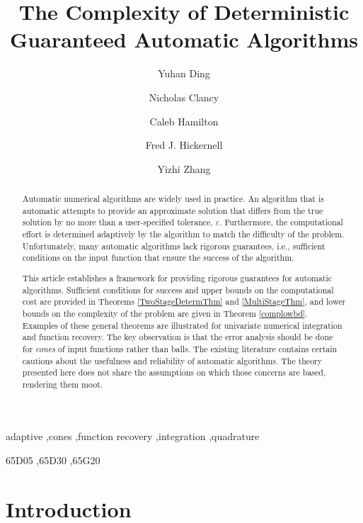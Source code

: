 \documentclass[]{elsarticle}
\theoremstyle{definition}
\theoremstyle{remark}
\begin{document}
\begin{frontmatter}

\title{The Complexity of Deterministic Guaranteed Automatic Algorithms}
\author{Yuhan Ding}
\author{Nicholas Clancy}
\author{Caleb Hamilton}
\author{Fred J. Hickernell}
\author{Yizhi Zhang}
\address{Room E1-208, Department of Applied Mathematics, Illinois Institute of Technology,\\ 10 W.\ 32$^{\text{nd}}$ St., Chicago, IL 60616}
\begin{abstract} Automatic numerical algorithms are widely used in practice.  An algorithm that is automatic attempts to provide an approximate solution that differs from the true solution by no more than a user-specified tolerance, $\varepsilon$. Furthermore, the computational effort is determined adaptively by the algorithm to match the difficulty of the problem.  Unfortunately, many automatic algorithms lack rigorous guarantees, i.e., sufficient conditions on the input function that ensure the success of the algorithm. 

This article establishes a framework for providing rigorous guarantees for automatic algorithms. Sufficient conditions for success and upper bounds on the computational cost are provided in Theorems \ref{TwoStageDetermThm} and \ref{MultiStageThm}, and lower bounds on the complexity of the problem are given in Theorem \ref{complowbd}. Examples of these general theorems are illustrated for univariate numerical integration and function recovery.  The key observation is that the error analysis should be done for \emph{cones} of input functions rather than balls. The existing literature contains certain cautions about the usefulness and reliability of automatic algorithms.  The theory presented here does not share the assumptions on which those concerns are based, rendering them moot.
\end{abstract}

\begin{keyword}
adaptive \sep cones \sep function recovery \sep integration \sep quadrature

\MSC[2010] 65D05 \sep 65D30 \sep 65G20

\end{keyword}
\end{frontmatter}

\section{Introduction}
\end{document}

